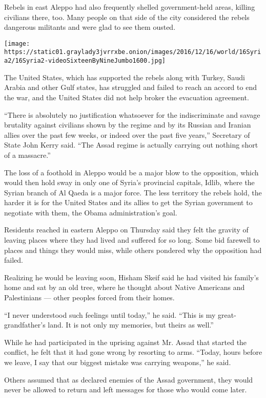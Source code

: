 Rebels in east Aleppo had also frequently shelled government-held areas,
killing civilians there, too. Many people on that side of the city
considered the rebels dangerous militants and were glad to see them
ousted.

\texttt{[image: https://static01.graylady3jvrrxbe.onion/images/2016/12/16/world/16Syria2/16Syria2-videoSixteenByNineJumbo1600.jpg]}

The United States, which has supported the rebels along with Turkey,
Saudi Arabia and other Gulf states, has struggled and failed to reach an
accord to end the war, and the United States did not help broker the
evacuation agreement.

``There is absolutely no justification whatsoever for the indiscriminate
and savage brutality against civilians shown by the regime and by its
Russian and Iranian allies over the past few weeks, or indeed over the
past five years,'' Secretary of State John Kerry said. ``The Assad
regime is actually carrying out nothing short of a massacre.''

The loss of a foothold in Aleppo would be a major blow to the
opposition, which would then hold sway in only one of Syria's provincial
capitals, Idlib, where the Syrian branch of Al Qaeda is a major force.
The less territory the rebels hold, the harder it is for the United
States and its allies to get the Syrian government to negotiate with
them, the Obama administration's goal.

Residents reached in eastern Aleppo on Thursday said they felt the
gravity of leaving places where they had lived and suffered for so long.
Some bid farewell to places and things they would miss, while others
pondered why the opposition had failed.

Realizing he would be leaving soon, Hisham Skeif said he had visited his
family's home and sat by an old tree, where he thought about Native
Americans and Palestinians --- other peoples forced from their homes.

``I never understood such feelings until today,'' he said. ``This is my
great-grandfather's land. It is not only my memories, but theirs as
well.''

While he had participated in the uprising against Mr. Assad that started
the conflict, he felt that it had gone wrong by resorting to arms.
``Today, hours before we leave, I say that our biggest mistake was
carrying weapons,'' he said.

Others assumed that as declared enemies of the Assad government, they
would never be allowed to return and left messages for those who would
come later.

